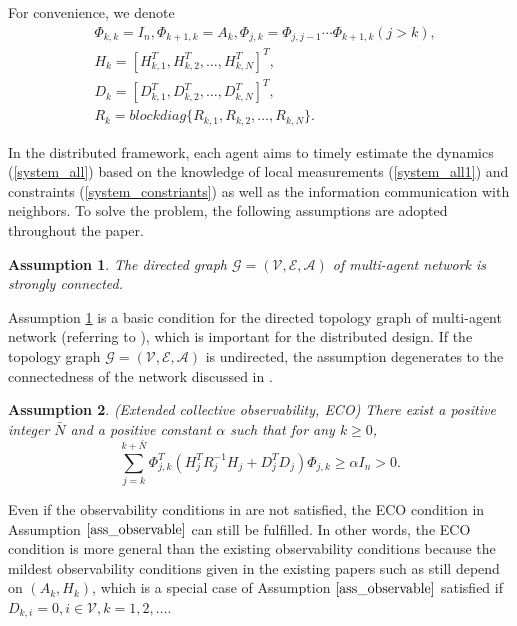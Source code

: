 \documentclass[journal,transmag]{IEEEtran}
\newtheorem{assumption}{\textbf{Assumption}}
\begin{document}
	
	For convenience, we denote
	\begin{align*}
	&\Phi_{k,k}=I_{n},\Phi_{k+1,k}=A_{k},\Phi_{j,k}=\Phi_{j,j-1}\cdots \Phi_{k+1,k}(j>k),\\
	&H_{k}=[H_{k,1}^T,H_{k,2}^T,\ldots,H_{k,N}^T]^T,\\
	&D_{k}=[D_{k,1}^T,D_{k,2}^T,\ldots,D_{k,N}^T]^T,\\
	&R_{k}=blockdiag\{R_{k,1},R_{k,2},\ldots,R_{k,N}\}.
	\end{align*}
	
		In the distributed framework, each agent aims to timely estimate the dynamics (\ref{system_all}) based on the knowledge of local measurements (\ref{system_all1}) and constraints (\ref{system_constriants}) as well as the information communication with neighbors. To solve the problem, the following assumptions are adopted throughout the paper.
	
	\begin{assumption}\label{ass_topology}
		The directed graph $\mathcal{G=(V,E,A)}$ of multi-agent network is strongly connected.
	\end{assumption}
	
	Assumption \ref{ass_topology} is a basic condition for the directed topology graph of multi-agent network (referring to \cite{yang2017stochastic}), which is important for the distributed design. If the topology graph $\mathcal{G=(V,E,A)}$ is undirected, the assumption degenerates to the connectedness of the network discussed in \cite{Battistelli2016Distributed,Dm2015Distributed}.
	
	\begin{assumption}\label{ass_observable}(Extended collective observability, ECO)
		There exist a positive integer $\bar N$ and a positive constant $\alpha$ such that for any $k\geq 0$,
		\begin{equation}\label{Observability_matrix}
		\sum_{j=k}^{k+\bar N}\Phi^T_{j,k}(H_{j}^TR_{j}^{-1}H_{j}+D_{j}^TD_{j})\Phi_{j,k}\geq \alpha I_n>0.
		\end{equation}	
	\end{assumption}	
	Even if the observability conditions in {\cite{Battistelli2014Kullback,Battistelli2016stability,Cat2010Diffusion,yang2017stochastic,Hu2012Diffusion,wang2017convergence} are not satisfied}, the ECO condition in Assumption $\ref{ass_observable}$  can still be fulfilled.
	In other words, the ECO condition is more general than the existing observability conditions \cite{Battistelli2014Kullback,Battistelli2015Consensus,Battistelli2016stability,Dm2015Distributed,wang2017convergence,olfati2009kalman,stankovic2009consensus,yang2014stochastic}
	 because the mildest observability conditions given in the existing papers such as \cite{Battistelli2014Kullback,Battistelli2016stability} still depend on $(A_{k},H_{k})$, which is a special case of Assumption $\ref{ass_observable}$ satisfied if $D_{k,i}=0,i\in\mathcal{V},k=1,2,\ldots$.
	
\end{document}
